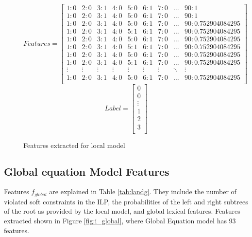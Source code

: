 \documentclass[document.tex]{subfiles}
\begin{document}
	\begin{figure}[H]
		\[
		Features = 
		\begin{bmatrix}
		1:0 & 2:0 &  3:1 & 4:0 & 5:0 & 6:1 & 7:0 & \dots & 90:1\\ 
		1:0 & 2:0 & 3:1 & 4:0 & 5:0 & 6:1 & 7:0 & \dots & 90:1\\ 
		1:0 & 2:0 & 3:1 & 4:0 & 5:0 & 6:1 & 7:0 & \dots & 90:0.752904084295\\
		1:0 & 2:0 & 3:1 & 4:0 & 5:1 & 6:1 & 7:0 & \dots & 90:0.752904084295\\
		1:0 & 2:0 & 3:1 & 4:0 & 5:0 & 6:1 & 7:0 & \dots & 90:0.752904084295\\
		1:0 & 2:0 & 3:1 & 4:0 & 5:1 & 6:1 & 7:0 & \dots & 90:0.752904084295\\
		1:0 & 2:0 & 3:1 & 4:0 & 5:0 & 6:1 & 7:0 & \dots & 90:0.752904084295\\
		1:0 & 2:0 & 3:1 & 4:0 & 5:1 & 6:1 & 7:0 & \dots & 90:0.752904084295\\
		\vdots & \vdots & \vdots & \vdots & \vdots & \vdots & \vdots & \ddots & \vdots\\
		1:0 & 2:0 & 3:1 & 4:0 & 5:0 & 6:1 & 7:0 & \dots & 90:0.752904084295\\
		\end{bmatrix}
		\]
		\[Label = 
		\begin{bmatrix}
		0 \\ 
		0\\ 
		\vdots\\
		1\\
		2\\
		3\\
		\end{bmatrix}
		\]
		\caption{Features extracted for local model}
		\label{fig:i_Local}
	\end{figure}
	\subsection{Global equation Model Features}
	Features $f_{global}$ are explained in Table \ref{tab:landg}. They include the number of violated soft constraints in the
	ILP, the probabilities of the left and right subtrees of
	the root as provided by the local model, and global
	lexical features. Features extracted shown in Figure \ref{fig:i_global}, where Global Equation model has 93 features.
	
\end{document}
